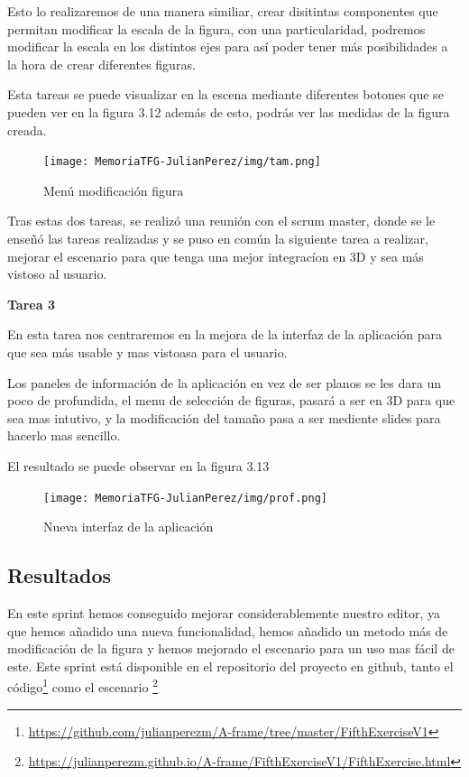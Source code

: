 \documentclass[a4paper, 12pt]{book}
\begin{document}
Esto lo realizaremos de una manera similiar, crear disitintas componentes que permitan modificar la escala de la figura, con una particularidad, podremos modificar la escala en los distintos ejes para así poder tener más posibilidades a la hora de crear diferentes figuras. 

Esta tareas se puede visualizar en la escena mediante diferentes botones que se pueden ver en la figura 3.12 además de esto, podrás ver las medidas de la figura creada.

\begin{figure}[H]
  \centering
  \texttt{[image: MemoriaTFG-JulianPerez/img/tam.png]}
  \caption{Menú modificación figura}\label{scrum}
\end{figure}


Tras estas dos tareas, se realizó una reunión con el scrum master, donde se le enseñó las tareas realizadas y se puso en común la siguiente tarea a realizar, mejorar el escenario para que tenga una mejor integracíon en 3D y sea más vistoso al usuario.

\textbf{Tarea 3}

En esta tarea nos centraremos en la mejora de la interfaz de la aplicación para que sea más usable y mas vistoasa para el usuario. 

Los paneles de información de la aplicación en vez de ser planos se les dara un poco de profundida, el menu de selección de figuras, pasará a ser en 3D para que sea mas intutivo, y la modificación del tamaño pasa a ser mediente slides para hacerlo mas sencillo.

El resultado se puede observar en la figura 3.13

\begin{figure}[H]
  \centering
  \texttt{[image: MemoriaTFG-JulianPerez/img/prof.png]}
  \caption{Nueva interfaz de la aplicación}\label{scrum}
\end{figure}

\subsection{Resultados}

En este sprint hemos conseguido mejorar considerablemente nuestro editor, ya que hemos añadido una nueva funcionalidad, hemos añadido un metodo más de modificación de la figura y hemos mejorado el escenario para un uso mas fácil de este. Este sprint está disponible en el repositorio del proyecto en github, tanto el código\footnote{\url{https://github.com/julianperezm/A-frame/tree/master/FifthExerciseV1}} como el escenario \footnote{\url{https://julianperezm.github.io/A-frame/FifthExerciseV1/FifthExercise.html}}
\end{document}
